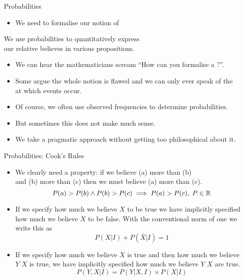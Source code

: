 \documentclass[mathserif, aspectratio=169]{beamer}
\begin{document}
\begin{frame}{Probabilities}
	\begin{itemize}
		\item We need to formalise our notion of 
	\end{itemize}
	\begin{cpage}\orange
		We use probabilities to quantitatively express\\
		our relative believes in various propositions.
	\end{cpage}
	\begin{itemize}
		\item We can hear the mathematicians scream ``How can you formalise a ?''.
		\item Some argue the whole notion is flawed and we can only ever speak of the \\
			at which events occur.
		\item Of course, we often use observed frequencies to determine probabilities.
		\item But sometimes this does not make much sense.
		\item We take a pragmatic approach without getting too philosophical about it.
	\end{itemize}
\end{frame}

\begin{frame}{Probabilities: Cook's Rules}
	\begin{itemize}
		\item We clearly need a  property: if we believe (a) more than (b)\\
			and (b) more than (c) then we must believe (a) more than (c).
			\[ P(a) > P(b) \land P(b) > P(c) \implies P(a) > P(c),\; P \in \mathbb{R} \]
		\item If we specify how much we believe $X$ to be true we have implicitly specified how much
			we believe $X$ to be false. With the conventional norm of one we write this as
			\[ P(X\vert I) + P(\bar{X}\vert I) = 1 \]
		\item If we specify how much we believe $X$ is true and then how much we believe\\
			$Y$  $X$ is true, we have implicitly specified how much we believe $Y$  $X$ are true.
			\[ P(Y, X\vert I) = P(Y\vert X, I) \times P(X\vert I) \]
	\end{itemize}
\end{frame}
\end{document}
